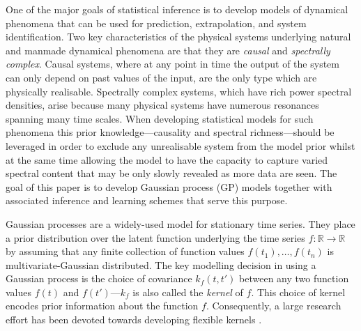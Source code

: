\documentclass{article}
\newcommand{\R}{\mathbb{R}}   %
\begin{document}
One of the major goals of statistical inference is to develop models of dynamical phenomena that can be used for prediction, extrapolation, and system identification. Two key characteristics of the physical systems underlying natural and manmade dynamical phenomena are that they are \textit{causal} and \textit{spectrally complex}. Causal systems, where at any point in time the output of the system can only depend on past values of the input, are the only type which are physically realisable. Spectrally complex systems, which have rich power spectral densities, arise because many physical systems have numerous resonances spanning many time scales. When developing statistical models for such phenomena this prior knowledge---causality and spectral richness---should be leveraged in order to exclude any unrealisable system from the model prior whilst at the same time allowing the model to have the capacity to capture varied spectral content that may be only slowly revealed as more data are seen. The goal of this paper is to develop Gaussian process (GP) models together with associated inference and learning schemes that serve this purpose.

Gaussian processes are a widely-used model for stationary time series. They place a prior distribution over the latent function underlying the time series $f:\R \to \R$ by assuming that any finite collection of function values $f(t_1),\ldots,f(t_n)$ is multivariate-Gaussian distributed. The key modelling decision in using a Gaussian process is the choice of covariance $k_f(t,t')$ between any two function values $f(t)$ and $f(t')$---$k_f$ is also called the \textit{kernel} of $f$. This choice of kernel encodes prior information about the function $f$. Consequently, a large research effort has been devoted towards developing flexible kernels \cite{Duvenaud:2014:Automatic_Construction,Wilson:2013:Spectral_Mixture,Tobar:2015:Learning_Stationary,Tobar:2015:Inter-Domain_Inducing}.
\end{document}
